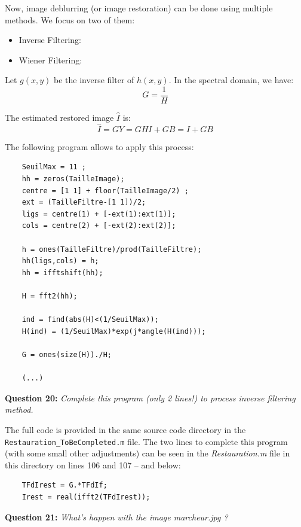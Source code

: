 Now, image deblurring (or image restoration) can be done using multiple methods. We focus on two of them:
\begin{itemize}
    \item Inverse Filtering: 
    \item Wiener Filtering: 
\end{itemize}

Let $g(x, y)$ be the inverse filter of $h(x, y)$. In the spectral domain, we have:
\begin{equation}
    G = \frac{1}{H}
\end{equation}

The estimated restored image $\hat{I}$ is:
\begin{equation}
    \hat{I} = GY = GHI + GB = I + GB
\end{equation}

The following program allows to apply this process:
\begin{lstlisting}
    SeuilMax = 11 ;
    hh = zeros(TailleImage);
    centre = [1 1] + floor(TailleImage/2) ;
    ext = (TailleFiltre-[1 1])/2;
    ligs = centre(1) + [-ext(1):ext(1)];
    cols = centre(2) + [-ext(2):ext(2)];
    
    h = ones(TailleFiltre)/prod(TailleFiltre);
    hh(ligs,cols) = h;
    hh = ifftshift(hh);
    
    H = fft2(hh);
    
    ind = find(abs(H)<(1/SeuilMax));
    H(ind) = (1/SeuilMax)*exp(j*angle(H(ind)));
    
    G = ones(size(H))./H;
    
    (...)
\end{lstlisting}


\textbf{Question 20:}
\textit{Complete this program (only 2 lines!) to process inverse ﬁltering method.}

The full code is provided in the same source code directory in the \texttt{Restauration\_ToBeCompleted.m} file. 
The two lines to complete this program (with some small other adjustments) can be seen in the \textit{Restauration.m} file in this directory on lines 106 and 107 -- and below:
\begin{lstlisting}
    TFdIrest = G.*TFdIf;
    Irest = real(ifft2(TFdIrest));
\end{lstlisting}


\textbf{Question 21:}
\textit{What’s happen with the image marcheur.jpg ?}






